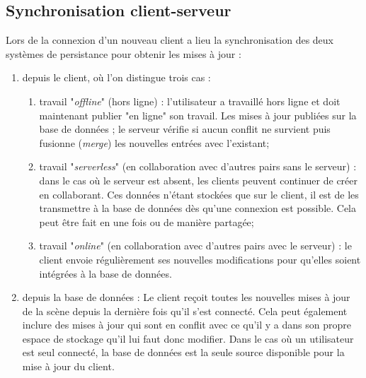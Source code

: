 \subsection{Synchronisation 
client-serveur}\label{sec:synchronisation-client-serveur}
Lors de la connexion d'un nouveau client a lieu la synchronisation des deux 
systèmes de persistance pour obtenir les mises à jour : 
\begin{enumerate}
	\item depuis le client, où l'on distingue trois cas :
	\begin{enumerate}
		\item travail "\textit{offline}" (hors ligne) : l'utilisateur a travaillé hors ligne et 
		doit maintenant publier "en ligne" son travail. Les mises à jour publiées sur la 
		base de données ; le serveur vérifie si aucun conflit ne survient puis 
		fusionne (\textit{merge}) les nouvelles entrées avec l'existant; 
		
		\item travail "\textit{serverless}" (en collaboration avec d'autres pairs sans le 
		serveur) : dans le cas où le serveur est absent, les clients peuvent continuer 
		de créer en collaborant. Ces données n'étant stockées que sur le client, il est 
		de les transmettre à la base de données dès qu'une connexion est possible. 
		Cela peut être fait en une fois ou de manière partagée;
		
		\item travail "\textit{online}" (en collaboration avec d'autres pairs avec le 
		serveur) : le client envoie régulièrement  ses 
		nouvelles modifications pour qu'elles soient intégrées à la base de données.
	\end{enumerate}
	\item depuis la base de données :
	Le client reçoit toutes les nouvelles mises à jour de la scène depuis la dernière 
	fois qu'il s'est connecté. Cela peut également inclure des mises à jour qui sont 
	en conflit avec ce qu'il y a dans son propre espace de stockage qu'il lui faut 
	donc modifier.
	Dans le cas où un utilisateur est seul connecté, la base de données est la 
	seule source disponible pour la mise à jour du client. 
\end{enumerate}


